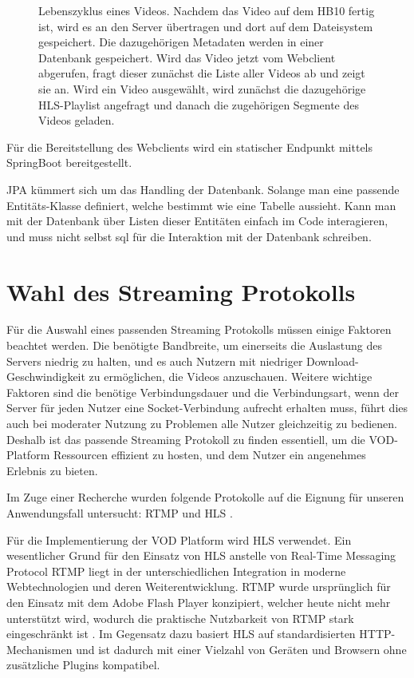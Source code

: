 \begin{figure}[H]
    \centering
    
    \caption[Lebenszyklus eines Videos]{Lebenszyklus eines Videos. Nachdem das Video auf dem HB10 fertig ist, wird es an den Server übertragen und dort auf dem Dateisystem gespeichert. Die dazugehörigen Metadaten werden in einer Datenbank gespeichert. Wird das Video jetzt vom Webclient abgerufen, 
    fragt dieser zunächst die Liste aller Videos ab und zeigt sie an. Wird ein Video ausgewählt, wird zunächst die dazugehörige HLS-Playlist angefragt und danach die zugehörigen Segmente des Videos geladen.}
    \label{fig:videocycle}
\end{figure}

Für die Bereitstellung des Webclients wird ein statischer Endpunkt mittels SpringBoot bereitgestellt. 

\ac{JPA} \cite{springdatajpa_getting_started} kümmert sich um das Handling der Datenbank. Solange man eine passende Entitäts-Klasse definiert, welche bestimmt wie eine Tabelle aussieht. Kann man mit der Datenbank über Listen dieser Entitäten einfach im Code interagieren, 
und muss nicht selbst sql für die Interaktion mit der Datenbank schreiben.

\section{Wahl des Streaming Protokolls} \label{sec:hls}

Für die Auswahl eines passenden Streaming Protokolls müssen einige Faktoren beachtet werden. Die benötigte Bandbreite, um einerseits die Auslastung des Servers niedrig zu halten, und es auch Nutzern mit niedriger Download-Geschwindigkeit zu ermöglichen, die Videos anzuschauen. 
Weitere wichtige Faktoren sind die benötige Verbindungsdauer und die Verbindungsart, wenn der Server für jeden Nutzer eine Socket-Verbindung aufrecht erhalten muss, führt dies auch bei moderater Nutzung zu Problemen alle Nutzer gleichzeitig zu bedienen. 
Deshalb ist das passende Streaming Protokoll zu finden essentiell, um die \ac{VOD}-Platform Ressourcen effizient zu hosten, und dem Nutzer ein angenehmes Erlebnis zu bieten.

Im Zuge einer Recherche wurden folgende Protokolle auf die Eignung für unseren Anwendungsfall untersucht: \ac{RTMP} \parencite{lei_jiang_wang_2012} und \ac{HLS} \parencite{Saini2026}.

Für die Implementierung der \ac{VOD} Platform wird HLS verwendet. Ein wesentlicher Grund für den Einsatz von \ac{HLS} anstelle von Real-Time Messaging Protocol \ac{RTMP} liegt in der unterschiedlichen Integration in moderne Webtechnologien und deren Weiterentwicklung. 
RTMP wurde ursprünglich für den Einsatz mit dem Adobe Flash Player konzipiert, welcher heute nicht mehr unterstützt wird, wodurch die praktische Nutzbarkeit von RTMP stark eingeschränkt ist \cite{lei_jiang_wang_2012}. 
Im Gegensatz dazu basiert HLS auf standardisierten HTTP-Mechanismen und ist dadurch mit einer Vielzahl von Geräten und Browsern ohne zusätzliche Plugins kompatibel. 

